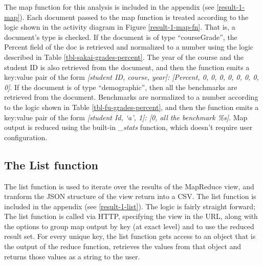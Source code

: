 The map function for this analysis is included in  the appendix (see \ref{result-1-map}). Each document passed to the map function is treated according to the logic shown in the activity diagram in Figure \ref{result-1-map-fn}. That is, a document's type is checked. If the document is of type ``courseGrade'', the Percent field of the doc is retrieved and normalized to a number using the logic described in Table \ref{tbl-sakai-grades-percent}. The year of the course and the student ID is also retrieved from the document, and then the function emits a key:value pair of the form \textit{[student ID, course, year]: [Percent, 0, 0, 0, 0, 0, 0, 0, 0]}. If the document is of type ``demographic'', then all the benchmarks are retrieved from the document. Benchmarks are normalized to a number according to the logic shown in Table  \ref{tbl-fu-grades-percent}, and then the function emits a key:value pair of the form \textit{[student Id, `a', 1]: [0, all the benchmark \%s]}. Map output is reduced using the built-in \textit{\_stats} function, which doesn't require user configuration.

\subsection*{The List function}
The list function is used to iterate over the results of the MapReduce view, and tranform the JSON structure of the view return into a CSV. The list function is included in the appendix (see \ref{result-1-list}). The logic is fairly straight forward; The list function is called via HTTP, specifying the view in the URL, along with the options to group map output by key (at exact level) and to use the reduced result set. For every unique key, the list function gets access to an object that is the output of the reduce function, retrieves the values from that object and returns those values as a string to the user.
